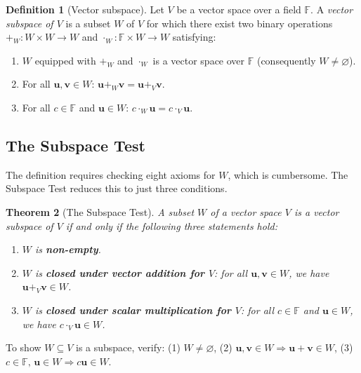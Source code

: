 \documentclass[11pt, a4paper, notitlepage]{report}
\newtheorem{theorem}{Theorem}[section]
\theoremstyle{definition}
\newtheorem{definition}[theorem]{Definition}
\theoremstyle{remark}
\begin{document}
\begin{definition}[Vector subspace]\label{def:subspace}
Let $V$ be a vector space over a field $\mathbb{F}$. A \emph{vector subspace of $V$} is a subset $W$ of $V$ for which there exist two binary operations $+_W : W \times W \to W$ and $\cdot_W : \mathbb{F} \times W \to W$ satisfying:
\begin{enumerate}
  \item $W$ equipped with $+_W$ and $\cdot_W$ is a vector space over $\mathbb{F}$ (consequently $W \neq \varnothing$).
  \item For all $\mathbf{u}, \mathbf{v} \in W$: $\mathbf{u} +_W \mathbf{v} = \mathbf{u} +_V \mathbf{v}$.
  \item For all $c \in \mathbb{F}$ and $\mathbf{u} \in W$: $c \cdot_W \mathbf{u} = c \cdot_V \mathbf{u}$.
\end{enumerate}
\end{definition}

\subsection{The Subspace Test}

The definition requires checking eight axioms for $W$, which is cumbersome. The Subspace Test reduces this to just three conditions.

\begin{theorem}[The Subspace Test]\label{thm:subspace-test}
A subset $W$ of a vector space $V$ is a vector subspace of $V$ if and only if the following three statements hold:
\begin{enumerate}
  \item $W$ is \textbf{non-empty}.
  \item $W$ is \textbf{closed under vector addition for $V$}: for all $\mathbf{u}, \mathbf{v} \in W$, we have $\mathbf{u} +_V \mathbf{v} \in W$.
  \item $W$ is \textbf{closed under scalar multiplication for $V$}: for all $c \in \mathbb{F}$ and $\mathbf{u} \in W$, we have $c \cdot_V \mathbf{u} \in W$.
\end{enumerate}
\end{theorem}

\begin{keyresult}[title={Key Result: The Subspace Test}]
To show $W \subseteq V$ is a subspace, verify: (1) $W \neq \varnothing$, (2) $\mathbf{u}, \mathbf{v} \in W \Rightarrow \mathbf{u} + \mathbf{v} \in W$, (3) $c \in \mathbb{F},\, \mathbf{u} \in W \Rightarrow c\mathbf{u} \in W$.
\end{keyresult}
\end{document}
